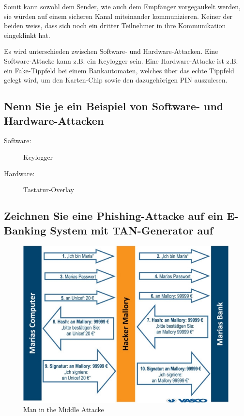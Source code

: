 \documentclass[a4paper, 11pt, nofootinbib]{article}
\begin{document}
Somit kann sowohl dem Sender, wie auch dem Empfänger vorgegaukelt werden, sie würden auf einem sicheren Kanal miteinander kommunizieren. Keiner der beiden weiss, dass sich noch ein dritter Teilnehmer in ihre Kommunikation eingeklinkt hat.

Es wird unterschieden zwischen Software- und Hardware-Attacken. Eine Software-Attacke kann z.B. ein Keylogger sein. Eine Hardware-Attacke ist z.B. ein Fake-Tippfeld bei einem Bankautomaten, welches über das echte Tippfeld gelegt wird, um den Karten-Chip sowie den dazugehörigen PIN auszulesen.

\subsection{Nenn Sie je ein Beispiel von Software- und Hardware-Attacken}
\begin{description}
	\item[Software: ] Keylogger
	\item[Hardware: ] Tastatur-Overlay
\end{description}

\subsection{Zeichnen Sie eine Phishing-Attacke auf ein E-Banking System mit TAN-Generator auf}
\begin{figure}[htb]
	\centering
	\includegraphics[keepaspectratio=true,height=18\baselineskip]{mitm.jpg}
	\caption{Man in the Middle Attacke}
	\label{fig:rel}
\end{figure}
\end{document}
